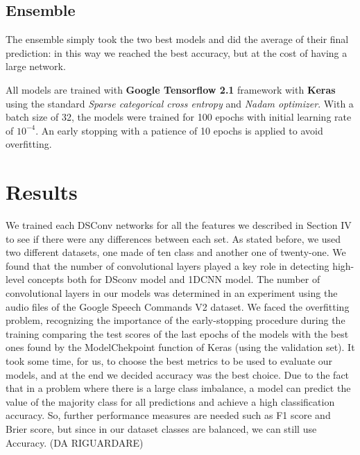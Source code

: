 \documentclass[conference]{IEEEtran}
\begin{document}
\subsection{Ensemble}
The ensemble simply took the two best models and did the average of their final prediction: in this way we reached the best accuracy, but at the cost of having a large network.

All models are trained with \textbf{Google Tensorflow 2.1} framework with \textbf{Keras} using the standard \textit{Sparse categorical cross entropy} and \textit{Nadam optimizer}. With a batch size of 32, the models were trained for 100 epochs with initial learning rate of $10^{-4}$. An early stopping with a patience of 10 epochs is applied to avoid overfitting.

\section{Results}
We trained each DSConv networks for all the features we described in Section IV to see if there were any differences between each set. As stated before, we used two different datasets, one made of ten class and another one of twenty-one.
We found that the number of convolutional layers played a key role in detecting high-level concepts both for DSconv model and 1DCNN model. The number of convolutional layers in our models was determined in an experiment using the audio files of the Google Speech Commands V2 dataset.
We faced the overfitting problem, recognizing the importance of the early-stopping procedure during the training comparing the test scores of the last epochs of the models with the best ones found by the ModelChekpoint function of Keras (using the validation set).
It took some time, for us, to choose the best metrics to be used to evaluate our models, and at the end we decided accuracy was the best choice. Due to the fact that in a problem where there is a large class imbalance, a model can predict the value of the majority class for all predictions and achieve a high classification accuracy. So, further performance measures are needed such as F1 score and Brier score, but since in our dataset classes are balanced, we can still use Accuracy. (DA RIGUARDARE)
\end{document}
